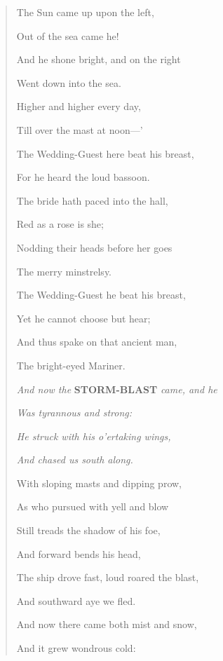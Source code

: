 \documentclass[12pt]{book}
\begin{document}
\begin{verse}
The Sun came up upon the left,

Out of the sea came he!

And he shone bright, and on the right

Went down into the sea.

\bigskip

Higher and higher every day,

Till over the mast at noon—'

\medskip

The Wedding-Guest here beat his breast,

For he heard the loud bassoon.

\clearpage

The bride hath paced into the hall,

Red as a rose is she;

Nodding their heads before her goes

The merry minstrelsy.

\bigskip

The Wedding-Guest he beat his breast,

Yet he cannot choose but hear;

\medskip

And thus spake on that ancient man,

The bright-eyed Mariner.

\bigskip
\bigskip
\bigskip

\textit{And now the} \textbf{STORM-BLAST} \textit{came, and he}

\textit{Was tyrannous and strong:}

\textit{He struck with his o'ertaking wings,}

\textit{And chased us south along.}

\bigskip
\bigskip

With sloping masts and dipping prow,

As who pursued with yell and blow

Still treads the shadow of his foe,

And forward bends his head,

\medskip

The ship drove fast, loud roared the blast,

And southward aye we fled.

\clearpage

And now there came both mist and snow,

And it grew wondrous cold:

\medskip


\end{verse}
\end{document}
